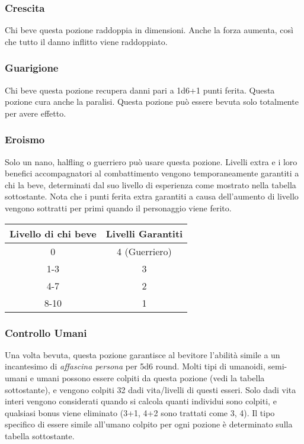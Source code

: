 \documentclass{article}
\begin{document}
\begin{multicols}{2}
\subsubsection{Crescita}
Chi beve questa pozione raddoppia in dimensioni. Anche la forza aumenta, così che tutto il danno inflitto viene raddoppiato.

\subsubsection{Guarigione}
Chi beve questa pozione recupera danni pari a 1d6+1 punti ferita. Questa pozione cura anche la paralisi. Questa pozione può essere bevuta solo totalmente per avere effetto.

\subsubsection{Eroismo}
Solo un nano, halfling o guerriero può usare questa pozione. Livelli extra e i loro benefici accompagnatori al combattimento vengono temporaneamente garantiti a chi la beve, determinati dal suo livello di esperienza come mostrato nella tabella sottostante. Nota che i punti ferita extra garantiti a causa dell'aumento di livello vengono sottratti per primi quando il personaggio viene ferito.

\begin{table}[h]
\centering
\begin{tabular}{|c|c|}
\hline
\textbf{Livello di chi beve} & \textbf{Livelli Garantiti} \\
\hline
0 & 4 (Guerriero) \\
1-3 & 3 \\
4-7 & 2 \\
8-10 & 1 \\
\hline
\end{tabular}

\end{table}

\subsubsection{Controllo Umani}
Una volta bevuta, questa pozione garantisce al bevitore l'abilità simile a un incantesimo di \textit{affascina persona} per 5d6 round. Molti tipi di umanoidi, semi-umani e umani possono essere colpiti da questa pozione (vedi la tabella sottostante), e vengono colpiti 32 dadi vita/livelli di questi esseri. Solo dadi vita interi vengono considerati quando si calcola quanti individui sono colpiti, e qualsiasi bonus viene eliminato (3+1, 4+2 sono trattati come 3, 4). Il tipo specifico di essere simile all'umano colpito per ogni pozione è determinato sulla tabella sottostante.


\end{multicols}
\end{document}
